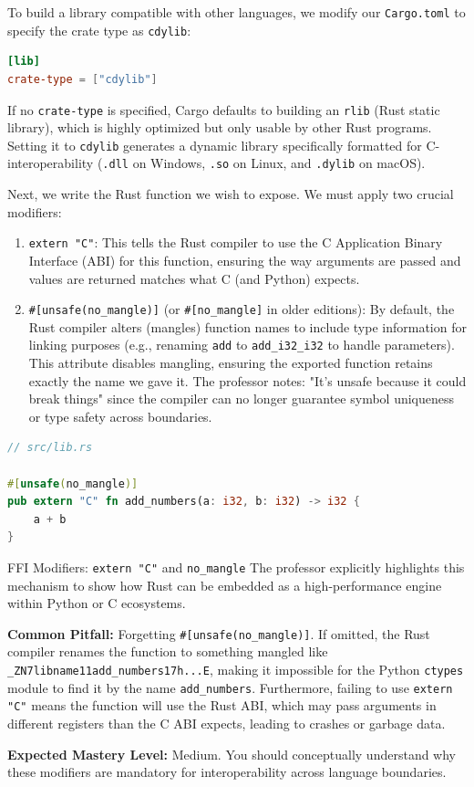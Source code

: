 To build a library compatible with other languages, we modify our \texttt{Cargo.toml} to specify the crate type as \texttt{cdylib}:

\begin{lstlisting}[language=toml]
[lib]
crate-type = ["cdylib"]
\end{lstlisting}

If no \texttt{crate-type} is specified, Cargo defaults to building an \texttt{rlib} (Rust static library), which is highly optimized but only usable by other Rust programs. Setting it to \texttt{cdylib} generates a dynamic library specifically formatted for C-interoperability (\texttt{.dll} on Windows, \texttt{.so} on Linux, and \texttt{.dylib} on macOS).

Next, we write the Rust function we wish to expose. We must apply two crucial modifiers:
\begin{enumerate}
    \item \texttt{extern "C"}: This tells the Rust compiler to use the C Application Binary Interface (ABI) for this function, ensuring the way arguments are passed and values are returned matches what C (and Python) expects.
    \item \texttt{\#[unsafe(no\_mangle)]} (or \texttt{\#[no\_mangle]} in older editions): By default, the Rust compiler alters (mangles) function names to include type information for linking purposes (e.g., renaming \texttt{add} to \texttt{add\_i32\_i32} to handle parameters). This attribute disables mangling, ensuring the exported function retains exactly the name we gave it. The professor notes: "It's unsafe because it could break things" since the compiler can no longer guarantee symbol uniqueness or type safety across boundaries.
\end{enumerate}

\begin{lstlisting}[language=Rust]
// src/lib.rs

#[unsafe(no_mangle)]
pub extern "C" fn add_numbers(a: i32, b: i32) -> i32 {
    a + b
}
\end{lstlisting}

\begin{examprioritybox}{FFI Modifiers: \texttt{extern "C"} and \texttt{no\_mangle}}
The professor explicitly highlights this mechanism to show how Rust can be embedded as a high-performance engine within Python or C ecosystems. 

\textbf{Common Pitfall:} Forgetting \texttt{\#[unsafe(no\_mangle)]}. If omitted, the Rust compiler renames the function to something mangled like \texttt{\_ZN7libname11add\_numbers17h...E}, making it impossible for the Python \texttt{ctypes} module to find it by the name \texttt{add\_numbers}. Furthermore, failing to use \texttt{extern "C"} means the function will use the Rust ABI, which may pass arguments in different registers than the C ABI expects, leading to crashes or garbage data.

\textbf{Expected Mastery Level:} Medium. You should conceptually understand why these modifiers are mandatory for interoperability across language boundaries.
\end{examprioritybox}

